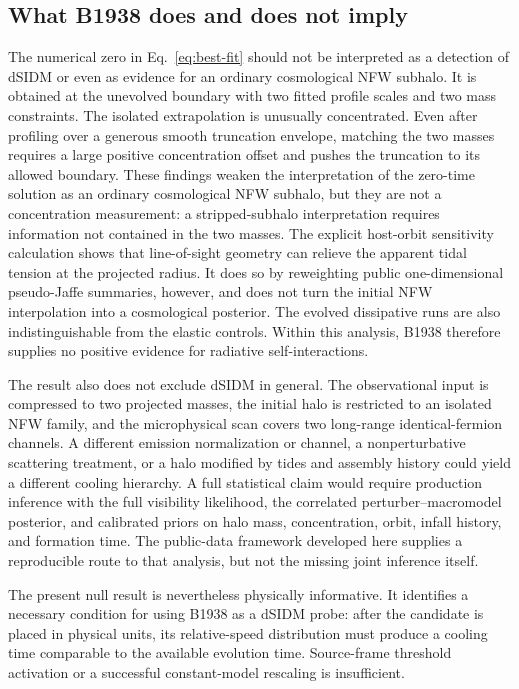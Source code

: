 \documentclass[12pt]{article}
\begin{document}
\subsection{What B1938 does and does not imply}

The numerical zero in Eq.~\eqref{eq:best-fit} should not be interpreted as a
detection of dSIDM or even as evidence for an ordinary cosmological NFW
subhalo.  It is obtained at the unevolved boundary with two fitted profile
scales and two mass constraints.  The isolated extrapolation is unusually
concentrated.  Even after profiling over a generous smooth truncation envelope,
matching the two masses requires a large positive concentration offset and
pushes the truncation to its allowed boundary.  These findings weaken the
interpretation of the zero-time solution as an ordinary cosmological NFW
subhalo, but they are not a concentration measurement: a stripped-subhalo
interpretation requires information not contained in the two masses.  The
explicit host-orbit sensitivity calculation shows that line-of-sight geometry
can relieve the apparent tidal tension at the projected radius.  It does so by
reweighting public one-dimensional pseudo-Jaffe summaries, however, and does
not turn the initial NFW interpolation into a cosmological posterior.  The
evolved dissipative runs are also indistinguishable from the elastic controls.
Within this analysis, B1938 therefore supplies no positive evidence for
radiative self-interactions.

The result also does not exclude dSIDM in general.  The observational input is
compressed to two projected masses, the initial halo is restricted to an
isolated NFW family, and the microphysical scan covers two long-range
identical-fermion channels.  A different emission normalization or channel, a
nonperturbative scattering treatment, or a halo modified by tides and assembly
history could yield a different cooling hierarchy.  A full statistical claim
would require production inference with the full visibility likelihood, the
correlated perturber--macromodel posterior, and calibrated priors on halo mass,
concentration, orbit, infall history, and formation time.  The public-data
framework developed here supplies a reproducible route to that analysis, but
not the missing joint inference itself.

The present null result is nevertheless physically informative.  It identifies
a necessary condition for using B1938 as a dSIDM probe: after the candidate is
placed in physical units, its relative-speed distribution must produce a
cooling time comparable to the available evolution time.  Source-frame
threshold activation or a successful constant-model rescaling is insufficient.
\end{document}
